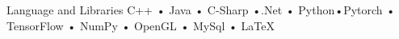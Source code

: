 
\begin{cvskills}
    \cvskill
      {Language and Libraries}
      {C++ \hspace{0.3em}•\hspace{0.3em} Java \hspace{0.3em}•\hspace{0.3em} C-Sharp \hspace{0.3em}•\hspace{0.3em}.Net \hspace{0.3em} • \hspace{0.3em}Python\hspace{0.3em}•\hspace{0.3em}Pytorch\hspace{0.3em} • \hspace{0.3em}TensorFlow \hspace{0.3em} • \hspace{0.3em} NumPy \hspace{0.3em}  • \hspace{0.3em} OpenGL\hspace{0.3em} • \hspace{0.3em} MySql\hspace{0.3em} • \hspace{0.3em} LaTeX }

\end{cvskills}